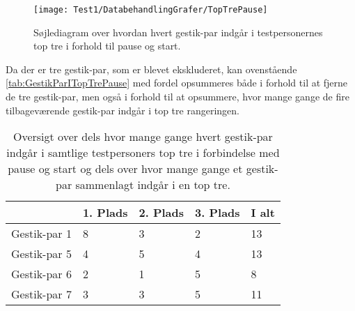 %
\begin{figure}[H]
	\centering
	\texttt{[image: Test1/DatabehandlingGrafer/TopTrePause]}
	\caption{Søjlediagram over hvordan hvert gestik-par indgår i testpersonernes top tre i forhold til pause og start.}
	\label{fig:SamletTopTrePause}
\end{figure}
\noindent
%
Da der er tre gestik-par, som er blevet ekskluderet, kan ovenstående  \autoref{tab:GestikParITopTrePause} med fordel opsummeres både i forhold til at fjerne de tre gestik-par, men også i forhold til at opsummere, hvor mange gange de fire tilbageværende gestik-par indgår i top tre rangeringen. 
%
\begin{table}[H]
	\centering
	\begin{tabular}{ | p{2.4cm} | p{2.4cm} | p{2.4cm} | p{2.4cm} |p{2.4cm}|}
	\hline
		 & 1. Plads & 2. Plads & 3. Plads & I alt \\ \hline
		Gestik-par 1 & 8 & 3 & 2 & 13\\ \hline
		Gestik-par 5 & 4 & 5 & 4 & 13\\ \hline
		Gestik-par 6 & 2 & 1 & 5 & 8\\ \hline 
		Gestik-par 7 & 3 & 3 & 5 & 11\\ \hline
	\end{tabular}
	\caption{Oversigt over dels hvor mange gange hvert gestik-par indgår i samtlige testpersoners top tre i forbindelse med pause og start og dels over hvor mange gange et gestik-par sammenlagt indgår i en top tre.}
	\label{tab:GestikParITopTrePauseOversigt}
\end{table}
\noindent
%
